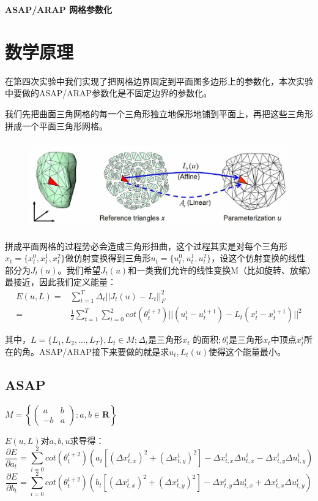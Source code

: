 \documentclass[12pt]{article}
\begin{document}
\begin{center}
\huge\textbf{ASAP/ARAP 网格参数化}
\end{center}



\section{数学原理}
在第四次实验中我们实现了把网格边界固定到平面图多边形上的参数化，本次实验中要做的ASAP/ARAP参数化是不固定边界的参数化。

我们先把曲面三角网格的每一个三角形独立地保形地铺到平面上，再把这些三角形拼成一个平面三角形网格。
\begin{figure}[htb]
\centering
\includegraphics[height=1.5in]{1.jpg}
\end{figure}

拼成平面网格的过程势必会造成三角形扭曲，这个过程其实是对每个三角形$x_t=\{x_t^0,x_t^1,x_t^2\}$做仿射变换得到三角形$u_t=\{u_t^0,u_t^1,u_t^2\}$，设这个仿射变换的线性部分为$J_t(u)$。我们希望$J_t(u)$和一类我们允许的线性变换M（比如旋转、放缩）最接近，因此我们定义能量：
\begin{align*}E(u,L)=&\sum\limits_{t=1}^T\Delta_t||J_t(u)-L_t||_F^2\\
 =&\frac12\sum\limits_{t=1}^T\sum\limits_{i=0}^2 cot(\theta_t^{i+2})||(u_t^i-u_t^{i+1})-L_t(x_t^i-x_t^{i+1})||^2  \end{align*}

其中，$L=\{L_1,L_2,...,L_T\},L_t\in M;
\Delta_t $是三角形$ x_t$ 的面积$;\theta_t^i$是三角形$x_t$中顶点$x_t^{i}$所在的角。ASAP/ARAP接下来要做的就是求$u_t,L_t(u)$使得这个能量最小。


\subsection{ASAP}
$M=\left\{  \begin{pmatrix}a & b\\-b & a\end{pmatrix}:a,b\in \mathbf{R}\right\}$

$E(u,L)$对$a,b,u$求导得：
$$\frac{\partial E}{\partial a_t}=\sum\limits_{i=0}^2 cot(\theta_t^{i+2})(a_t[(\Delta x_{t,x}^i)^2+(\Delta x_{t,y}^i)^2]-\Delta x_{t,x}^i\Delta u_{t,x}^i-\Delta x_{t,y}^i\Delta u_{t,y}^i)$$
$$\frac{\partial E}{\partial b_t}=\sum\limits_{i=0}^2 cot(\theta_t^{i+2})(b_t[(\Delta x_{t,x}^i)^2+(\Delta x_{t,y}^i)^2]-\Delta x_{t,y}^i\Delta u_{t,x}^i+\Delta x_{t,x}^i\Delta u_{t,y}^i)$$
\end{document}
